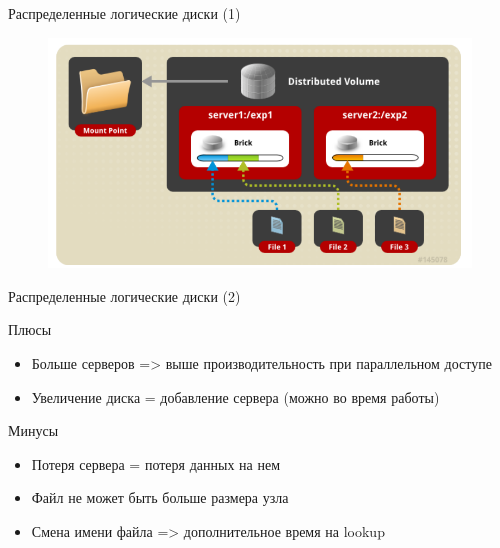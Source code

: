 \documentclass{beamer}
\begin{document}
\begin{frame}{Распределенные логические диски (1)}
	\begin{figure}[h]
		\centering
		\includegraphics[width=0.8\linewidth]{distributed.png}
	\end{figure}

\end{frame}

\begin{frame}{Распределенные логические диски (2)}
	\begin{block}{Плюсы}
		\begin{itemize}
			\item Больше серверов => выше производительность при параллельном доступе

			\item Увеличение диска = добавление сервера (можно во время работы) %
		\end{itemize}
	\end{block}
	\begin{block}{Минусы}
		\begin{itemize}
			\item Потеря сервера = потеря данных на нем
			\item Файл не может быть больше размера узла
			\item Смена имени файла => дополнительное время на lookup
		\end{itemize}
	\end{block}
\end{frame}
\end{document}
